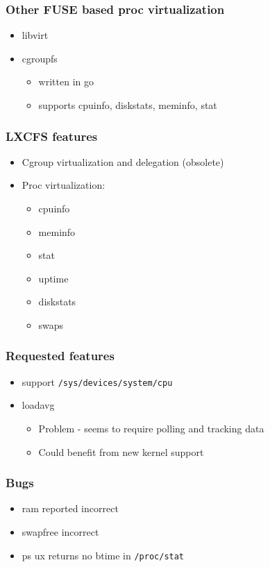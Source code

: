 \documentclass{beamer}
\begin{document}
\begin{frame}
\frametitle{Other FUSE based proc virtualization}
	\begin{itemize}
	\item libvirt
	\item cgroupfs
		\begin{itemize}
		\item written in go
		\item supports cpuinfo, diskstats, meminfo, stat
		\end{itemize}
	\end{itemize}
\end{frame}

\begin{frame}
\frametitle{LXCFS features}
	\begin{itemize}
	\item Cgroup virtualization and delegation (obsolete)
	\item Proc virtualization:
		\begin{itemize}
		\item cpuinfo
		\item meminfo
		\item stat
		\item uptime
		\item diskstats
		\item swaps
		\end{itemize}
	\end{itemize}
\end{frame}

\begin{frame}
\frametitle{Requested features}
	\begin{itemize}
	\item support {\tt /sys/devices/system/cpu}
	\item loadavg
		\begin{itemize}
		\item Problem - seems to require polling and tracking data
		\item Could benefit from new kernel support
		\end{itemize}
	\end{itemize}
\end{frame}

\begin{frame}
\frametitle{Bugs}
	\begin{itemize}
	\item ram reported incorrect
	\item swapfree incorrect
	\item ps ux returns no btime in {\tt /proc/stat}
	\end{itemize}
\end{frame}
\end{document}
